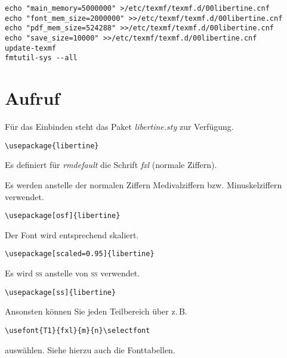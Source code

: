 \begin{enumerate}
\begin{lstlisting}
echo "main_memory=5000000" >/etc/texmf/texmf.d/00libertine.cnf
echo "font_mem_size=2000000" >>/etc/texmf/texmf.d/00libertine.cnf
echo "pdf_mem_size=524288" >>/etc/texmf/texmf.d/00libertine.cnf
echo "save_size=10000" >>/etc/texmf/texmf.d/00libertine.cnf
update-texmf
fmtutil-sys --all
\end{lstlisting}

\end{enumerate}




\newpage
\section{Aufruf}

Für das Einbinden steht das Paket \textit{libertine.sty} zur Verfügung.

\begin{lstlisting}
\usepackage{libertine}
\end{lstlisting}

Es definiert für \textit{rmdefault} die Schrift \textit{fxl} (normale Ziffern).


\begin{description}
\item [osf] Es werden anstelle der normalen Ziffern Medivalziffern bzw. Minuskelziffern verwendet.
\begin{lstlisting}
\usepackage[osf]{libertine}
\end{lstlisting}

\item [scaled] Der Font wird entsprechend skaliert.
\begin{lstlisting}
\usepackage[scaled=0.95]{libertine}
\end{lstlisting}

\item [ss] Es wird \textsc{ss} anstelle von \textsc{ß} verwendet.
\begin{lstlisting}
\usepackage[ss]{libertine}
\end{lstlisting}

\end{description}

Ansonsten können Sie jeden Teilbereich über z.\,B.
\begin{lstlisting}
\usefont{T1}{fxl}{m}{n}\selectfont
\end{lstlisting}
auswählen. Siehe hierzu auch die Fonttabellen.


